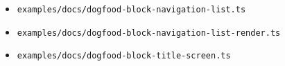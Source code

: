 \begin{itemize}
\begin{itemize}
    \texttt{e\allowbreak{}x\allowbreak{}a\allowbreak{}m\allowbreak{}p\allowbreak{}l\allowbreak{}e\allowbreak{}s\allowbreak{}/\allowbreak{}d\allowbreak{}o\allowbreak{}c\allowbreak{}s\allowbreak{}/\allowbreak{}d\allowbreak{}o\allowbreak{}g\allowbreak{}f\allowbreak{}o\allowbreak{}o\allowbreak{}d\allowbreak{}-\allowbreak{}b\allowbreak{}l\allowbreak{}o\allowbreak{}c\allowbreak{}k\allowbreak{}-\allowbreak{}d\allowbreak{}o\allowbreak{}c\allowbreak{}u\allowbreak{}m\allowbreak{}e\allowbreak{}n\allowbreak{}t\allowbreak{}a\allowbreak{}t\allowbreak{}i\allowbreak{}o\allowbreak{}n\allowbreak{}-\allowbreak{}a\allowbreak{}r\allowbreak{}t\allowbreak{}i\allowbreak{}c\allowbreak{}l\allowbreak{}e\allowbreak{}.\allowbreak{}t\allowbreak{}s}
  \item
    \texttt{e\allowbreak{}x\allowbreak{}a\allowbreak{}m\allowbreak{}p\allowbreak{}l\allowbreak{}e\allowbreak{}s\allowbreak{}/\allowbreak{}d\allowbreak{}o\allowbreak{}c\allowbreak{}s\allowbreak{}/\allowbreak{}d\allowbreak{}o\allowbreak{}g\allowbreak{}f\allowbreak{}o\allowbreak{}o\allowbreak{}d\allowbreak{}-\allowbreak{}b\allowbreak{}l\allowbreak{}o\allowbreak{}c\allowbreak{}k\allowbreak{}-\allowbreak{}n\allowbreak{}a\allowbreak{}v\allowbreak{}i\allowbreak{}g\allowbreak{}a\allowbreak{}t\allowbreak{}i\allowbreak{}o\allowbreak{}n\allowbreak{}-\allowbreak{}l\allowbreak{}i\allowbreak{}s\allowbreak{}t\allowbreak{}.\allowbreak{}t\allowbreak{}s}
  \item
    \texttt{e\allowbreak{}x\allowbreak{}a\allowbreak{}m\allowbreak{}p\allowbreak{}l\allowbreak{}e\allowbreak{}s\allowbreak{}/\allowbreak{}d\allowbreak{}o\allowbreak{}c\allowbreak{}s\allowbreak{}/\allowbreak{}d\allowbreak{}o\allowbreak{}g\allowbreak{}f\allowbreak{}o\allowbreak{}o\allowbreak{}d\allowbreak{}-\allowbreak{}b\allowbreak{}l\allowbreak{}o\allowbreak{}c\allowbreak{}k\allowbreak{}-\allowbreak{}n\allowbreak{}a\allowbreak{}v\allowbreak{}i\allowbreak{}g\allowbreak{}a\allowbreak{}t\allowbreak{}i\allowbreak{}o\allowbreak{}n\allowbreak{}-\allowbreak{}l\allowbreak{}i\allowbreak{}s\allowbreak{}t\allowbreak{}-\allowbreak{}r\allowbreak{}e\allowbreak{}n\allowbreak{}d\allowbreak{}e\allowbreak{}r\allowbreak{}.\allowbreak{}t\allowbreak{}s}
  \item
    \texttt{e\allowbreak{}x\allowbreak{}a\allowbreak{}m\allowbreak{}p\allowbreak{}l\allowbreak{}e\allowbreak{}s\allowbreak{}/\allowbreak{}d\allowbreak{}o\allowbreak{}c\allowbreak{}s\allowbreak{}/\allowbreak{}d\allowbreak{}o\allowbreak{}g\allowbreak{}f\allowbreak{}o\allowbreak{}o\allowbreak{}d\allowbreak{}-\allowbreak{}b\allowbreak{}l\allowbreak{}o\allowbreak{}c\allowbreak{}k\allowbreak{}-\allowbreak{}t\allowbreak{}i\allowbreak{}t\allowbreak{}l\allowbreak{}e\allowbreak{}-\allowbreak{}s\allowbreak{}c\allowbreak{}r\allowbreak{}e\allowbreak{}e\allowbreak{}n\allowbreak{}.\allowbreak{}t\allowbreak{}s}

\end{itemize}
\end{itemize}
